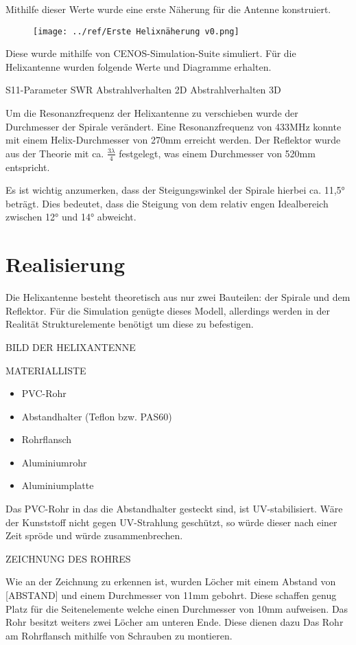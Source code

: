 Mithilfe dieser Werte wurde eine erste Näherung für die Antenne konstruiert. 

\begin{figure}
	\centering
	\texttt{[image: ../ref/Erste Helixnäherung v0.png]}
	\label{fig:ersteHelixnäherung}
\end{figure}

Diese wurde mithilfe von CENOS-Simulation-Suite simuliert. Für die Helixantenne wurden folgende Werte und Diagramme erhalten.

S11-Parameter
SWR
Abstrahlverhalten 2D
Abstrahlverhalten 3D

Um die Resonanzfrequenz der Helixantenne zu verschieben wurde der Durchmesser der Spirale verändert. Eine Resonanzfrequenz von 433MHz konnte mit einem Helix-Durchmesser von 270mm erreicht werden. Der Reflektor wurde aus der Theorie mit ca. $\frac{3\lambda}{4}$ festgelegt, was einem Durchmesser von 520mm entspricht.

Es ist wichtig anzumerken, dass der Steigungswinkel der Spirale hierbei ca. 11,5° beträgt. Dies bedeutet, dass die Steigung von dem relativ engen Idealbereich zwischen 12° und 14° abweicht.

\section{Realisierung}
Die Helixantenne besteht theoretisch aus nur zwei Bauteilen: der Spirale und dem Reflektor. Für die Simulation genügte dieses Modell, allerdings werden in der Realität Strukturelemente benötigt um diese zu befestigen.

BILD DER HELIXANTENNE

MATERIALLISTE
\begin{itemize}
	\item PVC-Rohr
	\item Abstandhalter (Teflon bzw. PAS60)
	\item Rohrflansch
	\item Aluminiumrohr
	\item Aluminiumplatte
\end{itemize}

Das PVC-Rohr in das die Abstandhalter gesteckt sind, ist UV-stabilisiert. Wäre der Kunststoff nicht gegen UV-Strahlung geschützt, so würde dieser nach einer Zeit spröde und würde zusammenbrechen.

ZEICHNUNG DES ROHRES

Wie an der Zeichnung zu erkennen ist, wurden Löcher mit einem Abstand von [ABSTAND] und einem Durchmesser von 11mm gebohrt. Diese schaffen genug Platz für die Seitenelemente welche einen Durchmesser von 10mm aufweisen. Das Rohr besitzt weiters zwei Löcher am unteren Ende. Diese dienen dazu Das Rohr am Rohrflansch mithilfe von Schrauben zu montieren. 

